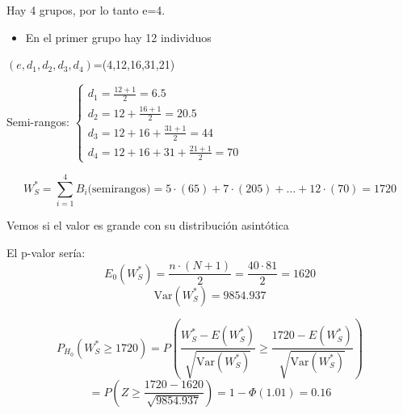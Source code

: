 Hay 4 grupos, por lo tanto e=4.

\begin{itemize}
    \item En el primer grupo hay 12 individuos
\end{itemize}

$(e,d_1,d_2,d_3,d_4)$=(4,12,16,31,21)

Semi-rangos:
\(
\left\{
\begin{matrix}
    d_1=\frac{12+1}{2}=6.5 \\
    d_2=12+\frac{16+1}{2}=20.5 \\
    d_3=12+16+\frac{31+1}{2}=44 \\
    d_4=12+16+31+\frac{21+1}{2}=70
\end{matrix}
\right.
\)

\[
W_S^*=\sum_{i=1}^{4} B_i \text{(semirangos)}=5\cdot (65)+ 7\cdot (205)+ \dots+12 \cdot (70)=1720
\]

Vemos si el valor es grande con su distribución asintótica

El p-valor sería:
\[
E_0(W_S^*) = \frac{n \cdot (N+1)}{2} = \frac{40 \cdot 81}{2} = 1620
\]
\[
\text{Var}(W_S^*) = 9854.937
\]

\[
P_{H_0}(W_S^* \geq 1720) = P \left( \frac{W_S^* - E(W_S^*)}{\sqrt{\text{Var}(W_S^*)}} \geq \frac{1720 - E(W_S^*)}{\sqrt{\text{Var}(W_S^*)}} \right)
\]
\[
= P \left(Z \geq \frac{1720 - 1620}{\sqrt{9854.937}} \right) = 1 - \Phi(1.01) = 0.16
\]
